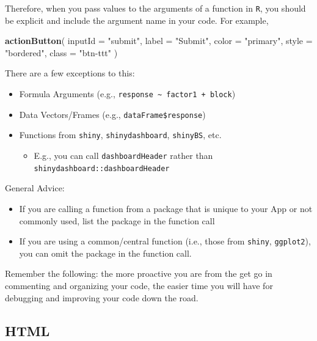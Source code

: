 \documentclass[]{book}
\newenvironment{Shaded}{\begin{snugshade}}{\end{snugshade}}
\newcommand{\DataTypeTok}[1]{\textcolor[rgb]{0.13,0.29,0.53}{#1}}
\newcommand{\KeywordTok}[1]{\textcolor[rgb]{0.13,0.29,0.53}{\textbf{#1}}}
\newcommand{\NormalTok}[1]{#1}
\newcommand{\StringTok}[1]{\textcolor[rgb]{0.31,0.60,0.02}{#1}}
\providecommand{\tightlist}{%
  \setlength{\itemsep}{0pt}\setlength{\parskip}{0pt}}
\begin{document}
Therefore, when you pass values to the arguments of a function in \texttt{R}, you should be explicit and include the argument name in your code. For example,

\begin{Shaded}
\begin{Highlighting}[]
\KeywordTok{actionButton}\NormalTok{(}
  \DataTypeTok{inputId =} \StringTok{"submit"}\NormalTok{,}
  \DataTypeTok{label =} \StringTok{"Submit"}\NormalTok{,}
  \DataTypeTok{color =} \StringTok{"primary"}\NormalTok{,}
  \DataTypeTok{style =} \StringTok{"bordered"}\NormalTok{,}
  \DataTypeTok{class =} \StringTok{"btn-ttt"}
\NormalTok{)}
\end{Highlighting}
\end{Shaded}

There are a few exceptions to this:

\begin{itemize}
\tightlist
\item
  Formula Arguments (e.g., \texttt{response\ \textasciitilde{}\ factor1\ +\ block})
\item
  Data Vectors/Frames (e.g., \texttt{dataFrame\$response})
\item
  Functions from \texttt{shiny}, \texttt{shinydashboard}, \texttt{shinyBS}, etc.

  \begin{itemize}
  \tightlist
  \item
    E.g., you can call \texttt{dashboardHeader} rather than \texttt{shinydashboard::dashboardHeader}
  \end{itemize}
\end{itemize}

General Advice:

\begin{itemize}
\tightlist
\item
  If you are calling a function from a package that is unique to your App or not commonly used, list the package in the function call
\item
  If you are using a common/central function (i.e., those from \texttt{shiny}, \texttt{ggplot2}), you can omit the package in the function call.
\end{itemize}

Remember the following: the more proactive you are from the get go in commenting and organizing your code, the easier time you will have for debugging and improving your code down the road.

\hypertarget{html}{%
\subsection{HTML}\label{html}}
\end{document}
